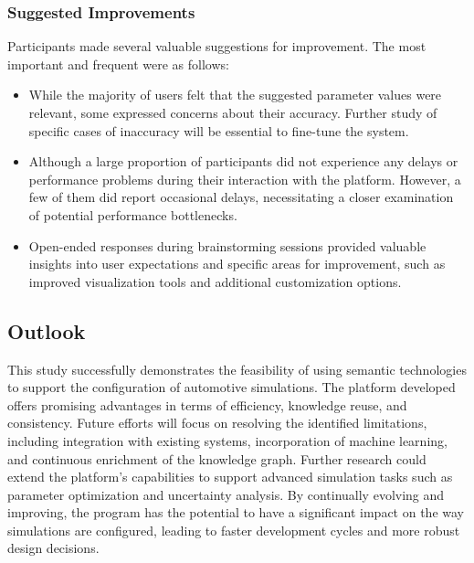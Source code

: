     
    \subsubsection*{Suggested Improvements}
    Participants made several valuable suggestions for improvement. The most important and frequent were as follows: 
    
    \begin{itemize}
        \item While the majority of users felt that the suggested parameter values were relevant, some expressed concerns about their accuracy. Further study of specific cases of inaccuracy will be essential to fine-tune the system.
    
        \item Although a large proportion of participants did not experience any delays or performance problems during their interaction with the platform. However, a few of them did report occasional delays, necessitating a closer examination of potential performance bottlenecks.
    
        \item Open-ended responses during brainstorming sessions provided valuable insights into user expectations and specific areas for improvement, such as improved visualization tools and additional customization options.
    \end{itemize}

\subsection{Outlook}
This study successfully demonstrates the feasibility of using semantic technologies to support the configuration of automotive simulations. The platform developed offers promising advantages in terms of efficiency, knowledge reuse, and consistency. Future efforts will focus on resolving the identified limitations, including integration with existing systems, incorporation of machine learning, and continuous enrichment of the knowledge graph. Further research could extend the platform's capabilities to support advanced simulation tasks such as parameter optimization and uncertainty analysis. By continually evolving and improving, the program has the potential to have a significant impact on the way simulations are configured, leading to faster development cycles and more robust design decisions.